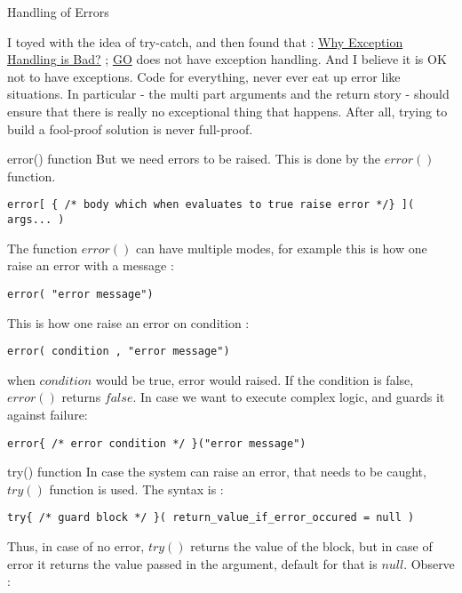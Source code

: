 \begin{section}{Handling of Errors}

I toyed with the idea of try-catch, and then found that : 
\href{http://stackoverflow.com/questions/1736146/why-is-exception-handling-bad}{Why Exception Handling is Bad?} ; 
\href{https://gobyexample.com/errors}{GO} does not have exception handling. 
And I believe it is OK not to have exceptions.
Code for everything, never ever eat up error like situations. 
In particular - the multi part arguments and the return story - should ensure that there is really no exceptional thing that happens. 
After all, trying to build a fool-proof solution is never full-proof.

\begin{subsection}{error() function}
But we need errors to be raised. This is done by the $error()$ function.

\begin{lstlisting}[style=JexlStyle]
error[ { /* body which when evaluates to true raise error */} ]( args... )   
\end{lstlisting}
The function $error()$ can have multiple modes, 
for example this is how one raise an error with a message :
\begin{lstlisting}[style=JexlStyle]
error( "error message")   
\end{lstlisting}
This is how one raise an error on condition :
\begin{lstlisting}[style=JexlStyle]
error( condition , "error message")   
\end{lstlisting}
when $condition$ would be true, error would raised.
If the condition is false, $error()$ returns $false$.
In case we want to execute complex logic, and guards it against failure:

\begin{lstlisting}[style=JexlStyle]
error{ /* error condition */ }("error message")   
\end{lstlisting}

\end{subsection}

\begin{subsection}{try() function}
In case the system can raise an error, that needs to be caught, 
$try()$ function is used. The syntax is :

\begin{lstlisting}[style=JexlStyle]
try{ /* guard block */ }( return_value_if_error_occured = null )   
\end{lstlisting}
Thus, in case of no error, $try()$ returns the value of the block, but in case 
of error it returns the value passed in the argument, default for that is $null$.
Observe :


\end{subsection}
\end{section}
